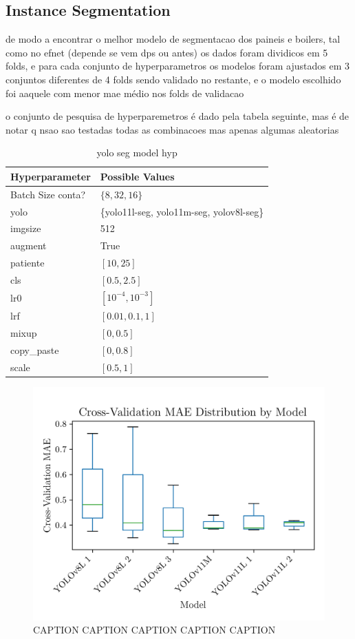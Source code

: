 \documentclass[conference]{IEEEtran}
\begin{document}
\subsection{Instance Segmentation}


de modo a encontrar o melhor modelo de segmentacao dos paineis e boilers, tal como no efnet (depende se vem dps ou antes) os dados foram dividicos em 5 folds, e para cada conjunto de hyperparametros os modelos foram ajustados em 3 conjuntos diferentes de 4 folds sendo validado no restante, e o modelo escolhido foi aaquele com menor mae médio nos folds de validacao

o conjunto de pesquisa de hyperparemetros é dado pela tabela seguinte, mas é de notar q nsao sao testadas todas as combinacoes mas apenas algumas aleatorias


\begin{table}[H]
\centering
\caption{yolo seg model hyp}
\label{parametrosseg}
\begin{tabular}{ll}
\toprule
\textbf{Hyperparameter} & \textbf{Possible Values} \\
\midrule
Batch Size conta? & $\{8, 32, 16\}$ \\
yolo & \{yolo11l-seg, yolo11m-seg, yolov8l-seg\} \\
imgsize & 512 \\
augment & True \\
patiente & $[10, 25]$ \\
cls & $[0.5, 2.5]$ \\
lr0 & $[10^{-4}, 10^{-3}]$ \\
lrf & $[0.01, 0.1, 1]$ \\
mixup & $[0, 0.5]$ \\
copy\_paste & $[0, 0.8]$ \\
scale & $[0.5, 1]$ \\
\bottomrule
\end{tabular}
\end{table}

\begin{figure}[H]
    \centering
    \includegraphics[width=1\linewidth]{assets/model02_mae_boxplot.png}
    \caption{CAPTION CAPTION CAPTION CAPTION CAPTION}
    \label{fig:model02_mae_boxplot}
\end{figure}
\end{document}
